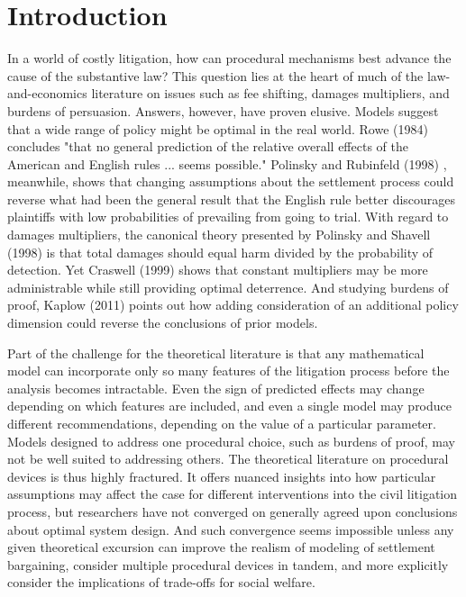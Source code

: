 \documentclass{article}
\begin{document}
\section{Introduction}

In a world of costly litigation, how can procedural mechanisms best advance the cause of the substantive law? This question lies at the heart of much of the law-and-economics literature on issues such as fee shifting, damages multipliers, and burdens of persuasion. Answers, however, have proven elusive. Models suggest that a wide range of policy might be optimal in the real world. Rowe (1984) \cite{rowe} concludes "that no general prediction of the relative overall effects of the American and English rules ... seems possible." Polinsky and Rubinfeld (1998) \cite{polinskyrubinfeld1998}, meanwhile, shows that changing assumptions about the settlement process could reverse what had been the general result that the English rule better discourages plaintiffs with low probabilities of prevailing from going to trial. With regard to damages multipliers, the canonical theory presented by Polinsky and Shavell (1998) \cite{polinskyshavell1998} is that total damages should equal harm divided by the probability of detection. Yet Craswell  (1999) \cite{craswell} shows that constant multipliers may be more administrable while still providing optimal deterrence. And studying burdens of proof, Kaplow (2011) \cite{kaplow} points out how adding consideration of an additional policy dimension could reverse the conclusions of prior models. 

Part of the challenge for the theoretical literature is that any mathematical model can incorporate only so many features of the litigation process before the analysis becomes intractable. Even the sign of predicted effects may change depending on which features are included, and even a single model may produce different recommendations, depending on the value of a particular parameter. Models designed to address one procedural choice, such as burdens of proof, may not be well suited to addressing others. The theoretical literature on procedural devices is thus highly fractured. It offers nuanced insights into how particular assumptions may affect the case for different interventions into the civil litigation process, but researchers have not converged on generally agreed upon conclusions about optimal system design. And such convergence seems impossible unless any given theoretical excursion can improve the realism of modeling of settlement bargaining, consider multiple procedural devices in tandem, and more explicitly consider the implications of trade-offs for social welfare.
\end{document}
